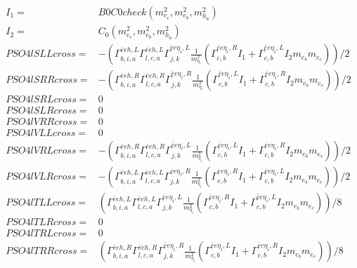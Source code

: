 \documentclass[A4,landscape]{article}
\begin{document}
\begin{align} 
I_1= & B0C0check(m^2_{e_{{c}}}, m^2_{e_{{b}}}, m^2_{h_{{a}}}) \\ 
I_2= & C_0(m^2_{e_{{c}}}, m^2_{e_{{b}}}, m^2_{h_{{a}}}) \\ 
  PSO4lSLLcross= & -( \Gamma^{\bar{e}e h ,L}_{b, i, a} \Gamma^{\bar{e}e h ,L}_{l, c, a} \Gamma^{\bar{e}e \eta_i ,L}_{j, k} \frac{1}{m^2_{\eta_i}} (\Gamma^{\bar{e}e \eta_i ,R}_{c, b} I_1 + \Gamma^{\bar{e}e \eta_i ,L}_{c, b} I_2 m_{e_{{b}}} m_{e_{{c}}}))/2 \\ 
  PSO4lSRRcross= & -( \Gamma^{\bar{e}e h ,R}_{b, i, a} \Gamma^{\bar{e}e h ,R}_{l, c, a} \Gamma^{\bar{e}e \eta_i ,R}_{j, k} \frac{1}{m^2_{\eta_i}} (\Gamma^{\bar{e}e \eta_i ,L}_{c, b} I_1 + \Gamma^{\bar{e}e \eta_i ,R}_{c, b} I_2 m_{e_{{b}}} m_{e_{{c}}}))/2 \\ 
  PSO4lSRLcross= & 0 \\ 
  PSO4lSLRcross= & 0 \\ 
  PSO4lVRRcross= & 0 \\ 
  PSO4lVLLcross= & 0 \\ 
  PSO4lVRLcross= & -( \Gamma^{\bar{e}e h ,R}_{b, i, a} \Gamma^{\bar{e}e h ,R}_{l, c, a} \Gamma^{\bar{e}e \eta_i ,L}_{j, k} \frac{1}{m^2_{\eta_i}} (\Gamma^{\bar{e}e \eta_i ,L}_{c, b} I_1 + \Gamma^{\bar{e}e \eta_i ,R}_{c, b} I_2 m_{e_{{b}}} m_{e_{{c}}}))/2 \\ 
  PSO4lVLRcross= & -( \Gamma^{\bar{e}e h ,L}_{b, i, a} \Gamma^{\bar{e}e h ,L}_{l, c, a} \Gamma^{\bar{e}e \eta_i ,R}_{j, k} \frac{1}{m^2_{\eta_i}} (\Gamma^{\bar{e}e \eta_i ,R}_{c, b} I_1 + \Gamma^{\bar{e}e \eta_i ,L}_{c, b} I_2 m_{e_{{b}}} m_{e_{{c}}}))/2 \\ 
  PSO4lTLLcross= & ( \Gamma^{\bar{e}e h ,L}_{b, i, a} \Gamma^{\bar{e}e h ,L}_{l, c, a} \Gamma^{\bar{e}e \eta_i ,L}_{j, k} \frac{1}{m^2_{\eta_i}} (\Gamma^{\bar{e}e \eta_i ,R}_{c, b} I_1 + \Gamma^{\bar{e}e \eta_i ,L}_{c, b} I_2 m_{e_{{b}}} m_{e_{{c}}}))/8 \\ 
  PSO4lTLRcross= & 0 \\ 
  PSO4lTRLcross= & 0 \\ 
  PSO4lTRRcross= & ( \Gamma^{\bar{e}e h ,R}_{b, i, a} \Gamma^{\bar{e}e h ,R}_{l, c, a} \Gamma^{\bar{e}e \eta_i ,R}_{j, k} \frac{1}{m^2_{\eta_i}} (\Gamma^{\bar{e}e \eta_i ,L}_{c, b} I_1 + \Gamma^{\bar{e}e \eta_i ,R}_{c, b} I_2 m_{e_{{b}}} m_{e_{{c}}}))/8 \\ 
\end{align} 
\end{document}
